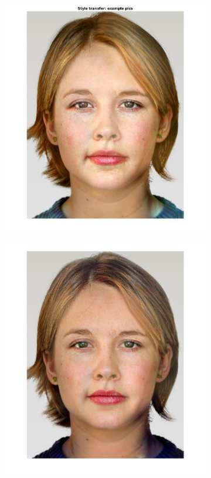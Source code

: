 \documentclass[a4paper]{iacas}
\begin{document}
\begin{figure}[!htbp]
	
	\begin{subfigure}[b]{0.32\textwidth}
		\includegraphics[width=\textwidth]{image_46_6.jpg}
		\caption{}
		\label{fig:i_46_6}
	\end{subfigure}
	\begin{subfigure}[b]{0.32\textwidth}
		\includegraphics[width=\textwidth]{image_46_16.jpg}

\end{subfigure}
\end{figure}
\end{document}

